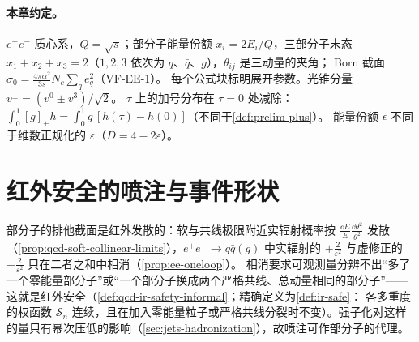 \paragraph{本章约定。}
$e^+e^-$ 质心系，$Q=\sqrt s$；部分子能量份额 $x_i=2E_i/Q$，三部分子末态 $x_1+x_2+x_3=2$（$1,2,3$ 依次为 $q$、$\bar q$、$g$），$\theta_{ij}$ 是三动量的夹角；
Born 截面 $\sigma_0=\frac{4\pi\alpha^2}{3s}N_c\sum_qe_q^2$（VF-EE-1）。%
每个公式块标明展开参数。光锥分量 $v^\pm=(v^0\pm v^3)/\sqrt2$。
$\tau$ 上的加号分布在 $\tau=0$ 处减除：$\int_0^1[g]_+h=\int_0^1g\,[h(\tau)-h(0)]$（不同于\cref{def:prelim-plus}）。
能量份额 $\epsilon$ 不同于维数正规化的 $\varepsilon$（$D=4-2\varepsilon$）。
\section{红外安全的喷注与事件形状}\label{sec:jets-irsafe}

部分子的排他截面是红外发散的：软与共线极限附近实辐射概率按 $\frac{\dd E}{E}\frac{\dd\theta^2}{\theta^2}$ 发散（\cref{prop:qcd-soft-collinear-limits}），$e^+e^-\to q\bar q(g)$ 中实辐射的 $+\frac{2}{\varepsilon^2}$ 与虚修正的 $-\frac{2}{\varepsilon^2}$ 只在二者之和中相消（\cref{prop:ee-oneloop}）。
相消要求可观测量分辨不出“多了一个零能量部分子”或“一个部分子换成两个严格共线、总动量相同的部分子”——这就是红外安全（\cref{def:qcd-ir-safety-informal}；精确定义为\cref{def:ir-safe}：
各多重度的权函数 $\mathcal S_n$ 连续，且在加入零能量粒子或严格共线分裂时不变）。强子化对这样的量只有幂次压低的影响（\cref{sec:jets-hadronization}），故喷注可作部分子的代理。

